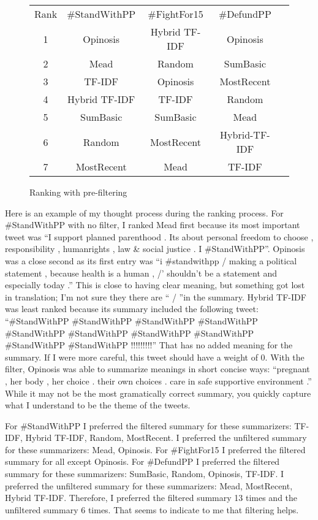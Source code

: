 \documentclass[paper=letter, fontsize=12pt]{article}
\begin{document}
\begin{figure}[h]
\begin{center}
\begin{tabular}{ |c||c|c|c|c| } 
 \hline
  Rank &  \#StandWithPP& \#FightFor15 & \#DefundPP\\
  1 & Opinosis & Hybrid TF-IDF & Opinosis\\
  2 & Mead & Random & SumBasic\\
  3 & TF-IDF & Opinosis & MostRecent\\
  4 & Hybrid TF-IDF & TF-IDF & Random\\
  5 & SumBasic & SumBasic & Mead\\
  6 & Random & MostRecent & Hybrid-TF-IDF\\
  7 & MostRecent & Mead & TF-IDF\\
 \hline
\end{tabular}
\end{center}
\caption{Ranking with pre-filtering}
\end{figure}

Here is an example of my thought process during the ranking process. For \#StandWithPP with no filter, I ranked Mead first because its most important tweet was ``I support planned parenthood . Its about personal freedom to choose , responsibility , humanrights , law \& social justice . I \#StandWithPP''. Opinosis was a close second as its first entry was ``i \#standwithpp / making a political statement , because health is a human , /' shouldn't be a statement and especially today .'' This is close to having clear meaning, but something got lost in translation; I'm not sure they there are `` / ''in the summary. Hybrid TF-IDF was least ranked because its summary included the following tweet: ``\#StandWithPP \#StandWithPP \#StandWithPP \#StandWithPP \#StandWithPP \#StandWithPP \#StandWithPP \#StandWithPP \#StandWithPP \#StandWithPP !!!!!!!!!'' That has no added meaning for the summary. If I were more careful, this tweet should have a weight of 0. With the filter, Opinosis was able to summarize meanings in short concise ways: ``pregnant , her body , her choice . their own choices . care in safe supportive environment .'' While it may not be the most gramatically correct summary, you quickly capture what I understand to be the theme of the tweets.

For \#StandWithPP I preferred the filtered summary for these summarizers: TF-IDF, Hybrid TF-IDF, Random, MostRecent. I preferred the unfiltered summary for these summarizers: Mead, Opinosis. For \#FightFor15 I preferred the filtered summary for all except Opinosis. For \#DefundPP I preferred the filtered summary for these summarizers: SumBasic, Random, Opinosis, TF-IDF. I preferred the unfiltered summary for these summarizers: Mead, MostRecent, Hybrid TF-IDF. Therefore, I preferred the filtered summary 13 times and the unfiltered summary 6 times. That seems to indicate to me that filtering helps.
\end{document}
